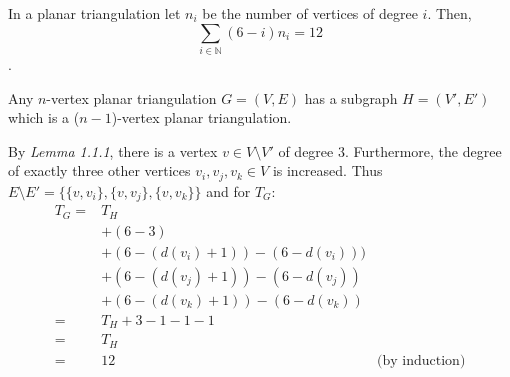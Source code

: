 \documentclass[a4paper]{article}
\begin{document}
\begin{solution}{17}
\begin{theorem}{In a planar triangulation let $n_i$ be the number of vertices of degree $i$. Then, \begin{equation*}\sum_{i \in \mathbb{N}} (6 - i)n_i = 12 \end{equation*}.}
\begin{itemize}
					Any $n$-vertex planar triangulation $G = (V, E)$ has a subgraph $H = (V', E')$ which is a  ($n - 1$)-vertex planar triangulation.
	
					By \emph{Lemma 1.1.1}, there is a vertex $v \in V \setminus V'$ of degree $3$. Furthermore, the degree of exactly three other vertices $v_i, v_j, v_k \in V$ is increased. Thus $E \setminus E' = \{\{v, v_i\}, \{v, v_j\}, \{v, v_k\}\}$ and for $T_G$:
					\begin{align*}
						T_G=&T_H\\
						 &+ (6 - 3)\\
						 &+ (6 - (d(v_i) + 1)) - (6 - d(v_i)))\\
						 &+ (6 - (d(v_j) + 1)) - (6 - d(v_j))\\
						 &+ (6 - (d(v_k) + 1)) - (6 - d(v_k))\\
						=&T_H +  3 - 1 - 1 -1\\
						=&T_H\\
						=&12&\text{(by induction)}
					\end{align*}
			\end{itemize}
		\end{theorem}
	\end{solution}
	\newpage
\end{document}
